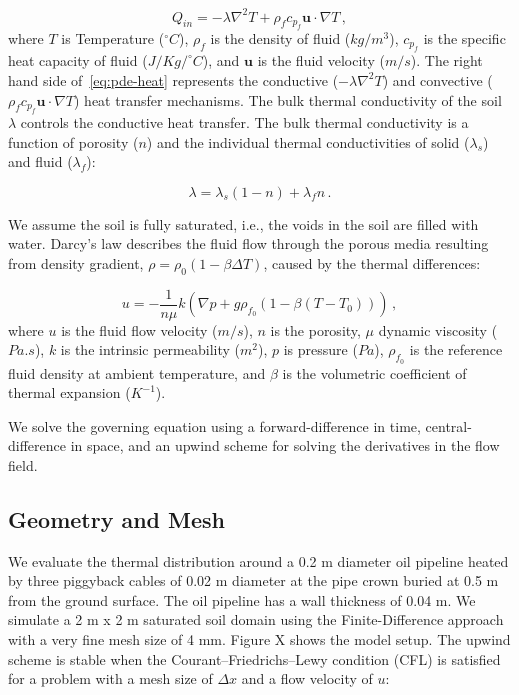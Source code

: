 \documentclass[Journal,letterpaper,InsideFigs]{ascelike-new}
\begin{document}
\begin{equation}
Q_{in} = - \lambda \nabla^2 T + \rho_f c_{p_f} \mathbf{u} \cdot \nabla T\,,
\label{eq:pde-heat}
\end{equation}
\noindent where $T$ is Temperature ($^\circ C$), $\rho_f$ is the density of fluid ($kg/m^3$), $c_{p_f}$ is the specific heat capacity of fluid ($J/Kg/^\circ C$), and $\mathbf{u}$ is the fluid velocity ($m/s$). The right hand side of~\cref{eq:pde-heat} represents the conductive ($- \lambda \nabla^2 T$) and convective ($ \rho_f c_{p_f} \mathbf{u} \cdot \nabla T$) heat transfer mechanisms. The bulk thermal conductivity of the soil $\lambda$ controls the conductive heat transfer. The bulk thermal conductivity is a function of porosity ($n$) and the individual thermal conductivities of solid ($\lambda_s$) and fluid ($\lambda_f$):

\begin{equation}
\lambda = \lambda_s ( 1 - n) + \lambda_f n\,.
\end{equation}

We assume the soil is fully saturated, i.e., the voids in the soil are filled with water. Darcy's law describes the fluid flow through the porous media resulting from density gradient, $\rho = \rho_0 (1 - \beta \Delta T)$, caused by the thermal differences:

\begin{equation}
u = - \frac{1}{n \mu} k \left(\nabla p + g \rho_{f_0} \left(1 - \beta (T - T_0)\right)\right)\,,
\end{equation}
where $u$ is the fluid flow velocity ($m/s$), $n$ is the porosity, $\mu$ dynamic viscosity ($Pa.s$), $k$ is the intrinsic permeability ($m^2$), $p$ is pressure ($Pa$), $\rho_{f_0}$ is the reference fluid density at ambient temperature, and $\beta$ is the volumetric coefficient of thermal expansion ($K^{-1}$). 

We solve the governing equation using a forward-difference in time, central-difference in space, and an upwind scheme for solving the derivatives in the flow field. 

\subsection*{Geometry and Mesh}

We evaluate the thermal distribution around a 0.2 m diameter oil pipeline heated by three piggyback cables of 0.02 m diameter at the pipe crown buried at 0.5 m from the ground surface. The oil pipeline has a wall thickness of 0.04 m. We simulate a 2 m x 2 m saturated soil domain using the Finite-Difference approach with a very fine mesh size of 4 mm. Figure X shows the model setup. The upwind scheme is stable when the Courant–Friedrichs–Lewy condition (CFL) is satisfied for a problem with a mesh size of $\Delta x$ and a flow velocity of $u$:
\end{document}
